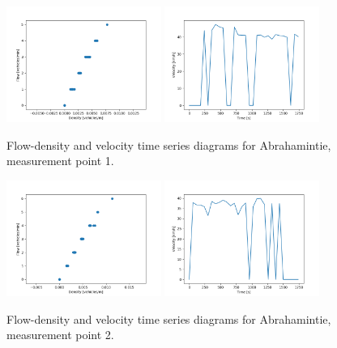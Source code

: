 \documentclass[english, 12pt, a4paper, elec, utf8, pdfa, online]{aaltothesis}
\begin{document}
\clearpage
\begin{figure}[ht!]
    \centering
    \includegraphics[width=0.45\textwidth]{graphs/Abrahamintie_1_flw_dns.png}
    \includegraphics[width=0.45\textwidth]{graphs/Abrahamintie_1_spd_time_6.png}
    \caption{Flow-density and velocity time series diagrams for Abrahamintie, measurement point 1.}
\end{figure}
\begin{figure}[ht!]
    \centering
    \includegraphics[width=0.45\textwidth]{graphs/Abrahamintie_2_flw_dns.png}
    \includegraphics[width=0.45\textwidth]{graphs/Abrahamintie_2_spd_time_6.png}
    \caption{Flow-density and velocity time series diagrams for Abrahamintie, measurement point 2.}
\end{figure}
\end{document}
